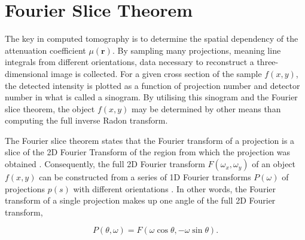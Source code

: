 
\section{Fourier Slice Theorem}
The key in computed tomography is to determine the spatial dependency of the attenuation coefficient $\mu(\bm{r})$.
By sampling many projections, meaning line integrals from different orientations, data necessary to reconstruct a three-dimensional image is collected.
For a given cross section of the sample $f(x, y)$, the detected intensity is plotted as a function of projection number and detector number in what is called a sinogram.
By utilising this sinogram and the Fourier slice theorem, the object $f(x, y)$ may be determined by other means than computing the full inverse Radon transform.

The Fourier slice theorem states that the Fourier transform of a projection
is a slice of the 2D Fourier Transform of the region from which the projection was obtained \cite{gonzalez2018digital}.
Consequently, the full 2D Fourier transform
$F(\omega_x, \omega_y)$ of an object $f(x,y)$ can be constructed from a series of 1D Fourier transforms
$P(\omega)$ of projections $p(s)$ with different orientations \cite{zeng2010medical}.
In other words, the Fourier transform of a single projection makes up one angle of the full 2D Fourier transform,

\begin{equation}\label{eq:Fourier_slice}
    P(\theta, \omega) = F \left( \omega \cos \theta, -\omega \sin \theta \right). %
\end{equation}




